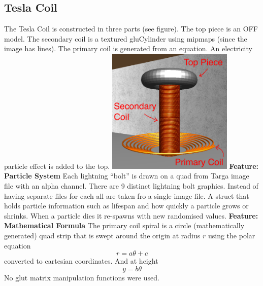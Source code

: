 \documentclass[10pt, oneside]{article}   	%
\begin{document}
\subsection{Tesla Coil}
The Tesla Coil is constructed in three parts (see figure).  The top piece is an OFF model.  The secondary coil is a textured gluCylinder using mipmaps (since the image has lines).  The primary coil is generated from an equation.  An electricity particle effect is added to the top.
\vspace{2mm}
\newline
\includegraphics[height=6cm]{coil.png}   %
\newline
\newline
\textbf{Feature: Particle System}\hspace{3mm} Each lightning ``bolt'' is drawn on a quad from Targa image file with an alpha channel.  There are 9 distinct lightning bolt graphics.  Instead of having separate files for each all are taken fro a single image file.  A struct that holds particle information such as lifespan and how quickly a particle grows or shrinks.  When a particle dies it re-spawns with new randomised values.
\newline
\newline
\textbf{Feature: Mathematical Formula}\hspace{3mm} The primary coil spiral is a circle (mathematically generated) quad strip that is swept around the origin at radius $r$ using the polar equation
\begin{equation}
r = a\theta + c
\end{equation}
converted to cartesian coordinates.  And at height
\begin{equation}
y = b\theta
\end{equation}
No glut matrix manipulation functions were used.

\newpage
\end{document}

